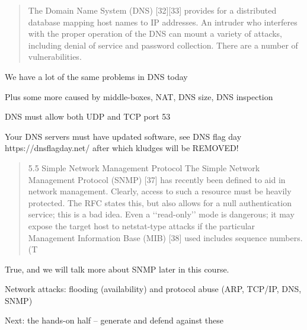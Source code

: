 \documentclass[Screen16to9,17pt]{foils}
\begin{document}

\begin{quote}
The Domain Name System (DNS) [32][33] provides for a distributed database mapping host names to IP
addresses. An intruder who interferes with the proper operation of the DNS can mount a variety of
attacks, including denial of service and password collection. There are a number of vulnerabilities.
\end{quote}

\begin{list1}
\item We have a lot of the same problems in DNS today
\item Plus some more caused by middle-boxes, NAT, DNS size, DNS inspection
\begin{list2}
\item DNS must allow both UDP and TCP port 53
\item Your DNS servers must have updated software, see DNS flag day\\ https://dnsflagday.net/ after which kludges will be REMOVED!
\end{list2}
\end{list1}


\begin{quote}
5.5 Simple Network Management Protocol
The Simple Network Management Protocol (SNMP) [37] has recently been defined to aid in network
management. Clearly, access to such a resource must be heavily protected. The RFC states this, but
also allows for a null authentication service; this is a bad idea. Even a ‘‘read-only’’ mode is dangerous;
it may expose the target host to netstat-type attacks if the particular Management Information Base
(MIB) [38] used includes sequence numbers. (T
\end{quote}

True, and we will talk more about SNMP later in this course.

\begin{list2}
\item Network attacks: flooding (availability) and protocol abuse (ARP, TCP/IP, DNS, SNMP)
\item Next: the hands-on half -- generate and defend against these
\end{list2}
\end{document}
